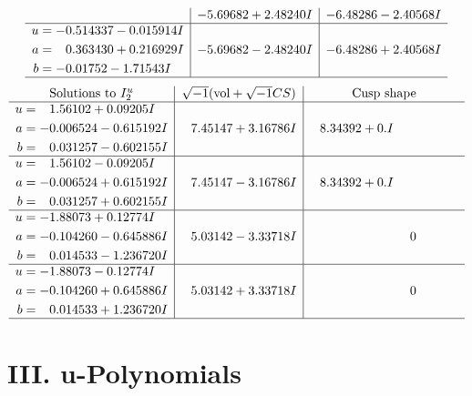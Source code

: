 \documentclass[1p]{elsarticle_modified}
\theoremstyle{definition}
\newcommand{\I}{\sqrt{-1}}
\begin{document}
$$\begin{array}{c|c|c}
 & -5.69682 + 2.48240 I & -6.48286 - 2.40568 I \\ \hline\begin{aligned}
u &= -0.514337 - 0.015914 I \\
a &= \phantom{-}0.363430 + 0.216929 I \\
b &= -0.01752 - 1.71543 I\end{aligned}
 & -5.69682 - 2.48240 I & -6.48286 + 2.40568 I\\
 \hline 
 \end{array}$$\newpage$$\begin{array}{c|c|c}  
\text{Solutions to }I^u_{2}& \I (\text{vol} + \sqrt{-1}CS) & \text{Cusp shape}\\
 \hline 
\begin{aligned}
u &= \phantom{-}1.56102 + 0.09205 I \\
a &= -0.006524 - 0.615192 I \\
b &= \phantom{-}0.031257 - 0.602155 I\end{aligned}
 & \phantom{-}7.45147 + 3.16786 I & \phantom{-}8.34392 + 0. I\phantom{ +0.000000I} \\ \hline\begin{aligned}
u &= \phantom{-}1.56102 - 0.09205 I \\
a &= -0.006524 + 0.615192 I \\
b &= \phantom{-}0.031257 + 0.602155 I\end{aligned}
 & \phantom{-}7.45147 - 3.16786 I & \phantom{-}8.34392 + 0. I\phantom{ +0.000000I} \\ \hline\begin{aligned}
u &= -1.88073 + 0.12774 I \\
a &= -0.104260 - 0.645886 I \\
b &= \phantom{-}0.014533 - 1.236720 I\end{aligned}
 & \phantom{-}5.03142 - 3.33718 I & \phantom{-0.000000 } 0 \\ \hline\begin{aligned}
u &= -1.88073 - 0.12774 I \\
a &= -0.104260 + 0.645886 I \\
b &= \phantom{-}0.014533 + 1.236720 I\end{aligned}
 & \phantom{-}5.03142 + 3.33718 I & \phantom{-0.000000 } 0\\
 \hline 
 \end{array}$$\newpage
\newpage\renewcommand{\arraystretch}{1}
\centering \section*{ III. u-Polynomials}
\end{document}
